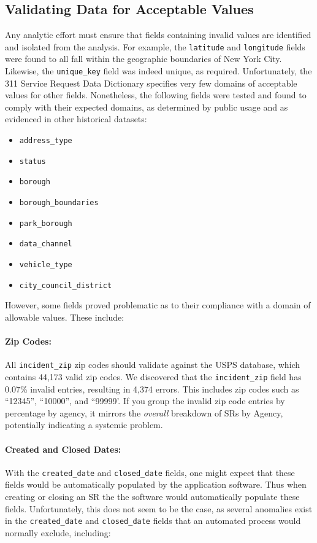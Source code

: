 \documentclass[linenumber]{jdsart}
\begin{document}
\subsection{Validating Data for Acceptable Values}
\label{sec:domain}
Any analytic effort must ensure that fields containing invalid values 
are identified and isolated from the analysis. For example, the \texttt{latitude} 
and \texttt{longitude} fields were found to all fall within the 
geographic boundaries of New York City. Likewise, 
the \texttt{unique\_key} field was indeed unique, as required. 
Unfortunately, the 311 Service Request Data Dictionary specifies very few domains of 
acceptable values for other fields. Nonetheless, the following fields were tested and found to comply with their expected domains, as determined by public 
usage and as evidenced in other historical datasets:

\begin{itemize}[left=1.5em]
    \item \texttt{address\_type}
    \item \texttt{status}
    \item \texttt{borough}
    \item \texttt{borough\_boundaries}
    \item \texttt{park\_borough}
    \item \texttt{data\_channel}
    \item \texttt{vehicle\_type}
    \item \texttt{city\_council\_district}
\end{itemize}

However,  some fields proved problematic as to their 
compliance with a domain of allowable values. These include: 

\paragraph{Zip Codes:}
\label{sec:zipcodesissues}
All \texttt{incident\_zip} zip codes should 
validate against the USPS database, which contains 
44,173 valid zip codes. We discovered that the \texttt{incident\_zip} 
field has 0.07\% invalid entries, resulting in 4,374 errors. This includes
zip codes such as ``12345'', ``10000'', and ``99999'. If you group 
the invalid zip code entries by percentage by agency, it 
mirrors the \textit{overall} breakdown of SRs by Agency, potentially 
indicating a systemic problem.


\paragraph{Created and Closed Dates:}
\label{sec:negativeduration}
With the \texttt{created\_date} and \texttt{closed\_date} fields, one 
might expect that these fields would be automatically populated by the  
application software. Thus when creating  or closing an SR 
the the software would automatically populate these fields. 
Unfortunately, this does not seem to be the case, as several anomalies 
exist in the \texttt{created\_date} and \texttt{closed\_date} fields that
an automated process would normally exclude, including:
\end{document}
